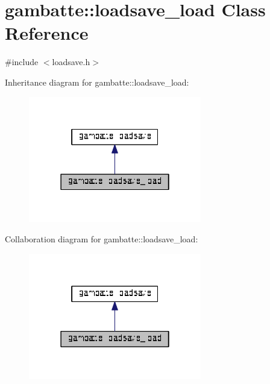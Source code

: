 \hypertarget{classgambatte_1_1loadsave__load}{}\section{gambatte\+:\+:loadsave\+\_\+load Class Reference}
\label{classgambatte_1_1loadsave__load}


{\ttfamily \#include $<$loadsave.\+h$>$}



Inheritance diagram for gambatte\+:\+:loadsave\+\_\+load\+:\nopagebreak
\begin{figure}[H]
\begin{center}
\leavevmode
\includegraphics[width=214pt]{classgambatte_1_1loadsave__load__inherit__graph}
\end{center}
\end{figure}


Collaboration diagram for gambatte\+:\+:loadsave\+\_\+load\+:\nopagebreak
\begin{figure}[H]
\begin{center}
\leavevmode
\includegraphics[width=214pt]{classgambatte_1_1loadsave__load__coll__graph}
\end{center}
\end{figure}
